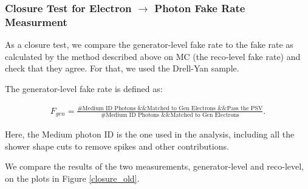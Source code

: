 \subsubsection{Closure Test for Electron $\rightarrow$ Photon Fake Rate Measurment}

As a closure test, we compare the generator-level fake rate to the fake rate as calculated by the method described above on MC (the reco-level fake rate) and check that they agree.
For that, we used the Drell-Yan sample.

The generator-level fake rate is defined as:

\begin{eqnarray}
F_{gen} = \frac{\textrm{\#Medium ID Photons \&\& Matched to Gen Electrons \&\& Pass the PSV}}{\textrm{\#Medium ID Photons \&\& Matched to Gen Electrons}}. \label{gen_fake}
\end{eqnarray}

Here, the Medium photon ID is the one used in the analysis, including all the shower shape cuts to remove spikes and other contributions.

We compare the results of the two measurements, generator-level and reco-level, on the plots in Figure \ref{closure_old}.

